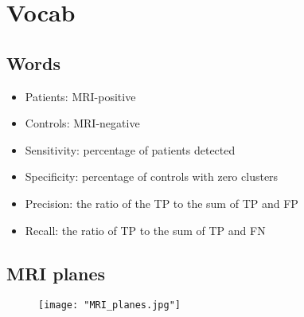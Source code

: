 \chapter{Vocab}

\section{Words}

\begin{itemize}
	\item Patients: MRI-positive
	\item Controls: MRI-negative
	\item Sensitivity: percentage of patients detected
	\item Specificity: percentage of controls with zero clusters
	\item Precision: the ratio of the TP to the sum of TP and FP
	\item Recall: the ratio of TP to the sum of TP and FN
\end{itemize}

\section{MRI planes}

\begin{figure}[htbp]
	\centering
	\texttt{[image: "MRI\_planes.jpg"]}
\end{figure}

